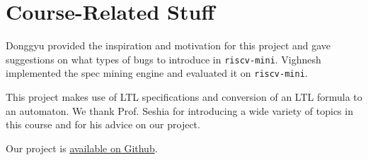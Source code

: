 \documentclass[acmlarge,11pt,nonacm]{acmart}
\begin{document}
\section{Course-Related Stuff}
Donggyu provided the inspiration and motivation for this project and gave suggestions on what types of bugs to introduce in \texttt{riscv-mini}.
Vighnesh implemented the spec mining engine and evaluated it on \texttt{riscv-mini}.

This project makes use of LTL specifications and conversion of an LTL formula to an automaton.
We thank Prof. Seshia for introducing a wide variety of topics in this course and for his advice on our project.

Our project is \href{https://github.com/vighneshiyer/spec-mining/}{available on Github}.



\end{document}
